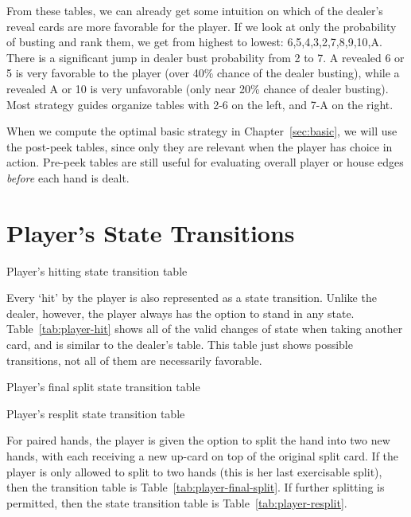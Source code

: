 From these tables, we can already get some intuition on
which of the dealer's reveal cards are more favorable for the player.
If we look at only the probability of busting and rank them, 
we get from highest to lowest: 6,5,4,3,2,7,8,9,10,A.
There is a significant jump in dealer bust probability from 2 to 7.  
A revealed 6 or 5 is very favorable to the player (over 40\% chance of 
the dealer busting), 
while a revealed A or 10 is very unfavorable 
(only near 20\% chance of dealer busting).
Most strategy guides organize tables with 2-6 on the left, 
and 7-A on the right.


When we compute the optimal basic strategy in Chapter~\ref{sec:basic}, 
we will use the post-peek tables, since only they are relevant
when the player has choice in action.  
Pre-peek tables are still useful for evaluating overall player or house
edges \emph{before} each hand is dealt.

\section{Player's State Transitions}
\label{sec:rules:player-hit}

\begin{table}[ht!]
\caption{Player's hitting state transition table}
\begin{center}
{\small

}
\end{center}
\label{tab:player-hit}
\end{table}

Every `hit' by the player is also represented as a state transition.
Unlike the dealer, however, the player always has the option
to stand in any state.
Table~\ref{tab:player-hit} shows all of the valid changes of state
when taking another card, and is similar to the dealer's table.
This table just shows possible transitions, 
not all of them are necessarily favorable.

\begin{table}[ht!]
\caption{Player's final split state transition table}
\begin{center}
{\small

}
\end{center}
\label{tab:player-final-split}
\end{table}

\begin{table}[ht!]
\caption{Player's resplit state transition table}
\begin{center}
{\small

}
\end{center}
\label{tab:player-resplit}
\end{table}

For paired hands, the player is given the option to split the
hand into two new hands, with each receiving a new up-card on top
of the original split card.
If the player is only allowed to split to two hands
(this is her last exercisable split), 
then the transition table is Table~\ref{tab:player-final-split}.
If further splitting is permitted, then the state transition table
is Table~\ref{tab:player-resplit}.

